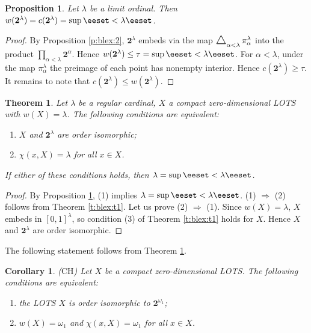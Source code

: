 \documentclass[preprint]{elsarticle}
\def\om{\omega}
\def\al{\alpha}
\def\la{\lambda}
\def\set#1{\bbset#1\eeset}
\def\bbset#1:#2\eeset{\{#1\,:\,#2\}}
\def\diag{\mathop{\bigtriangleup}}
\newtheorem{proposition}{Proposition}[section]
\newtheorem{theorem}{Theorem}[section]
\newtheorem{cor}{Corollary}[section]
\theoremstyle{definition}
\theoremstyle{remark}
\def\rarr{\Rightarrow}
\def\DD{\operatornamewithlimits{%
  \mathchoice{\vcenter{\hbox{\huge \Delta}}}
             {\vcenter{\hbox{\Large \Delta}}}
             {\mathrm{\Delta}}
             {\mathrm{\Delta}}}}
\def\DD{\operatornamewithlimits{\mbox{\hbox{\huge \Delta}}}}
\def\DD{\operatornamewithlimits{\Delta}}
\def\DD{\operatornamewithlimits{%
  \mathchoice{\vcenter{\hbox{\huge $\Delta$}}}
             {\vcenter{\hbox{\Large $\Delta$}}}
             {\mathrm{\Delta}}
             {\mathrm{\Delta}}}}
\def\DD{\operatornamewithlimits{%
  \mathchoice{\vcenter{\hbox{\huge $\bigtriangleup$}}}
             {\vcenter{\hbox{\Large $\bigtriangleup$}}}
             {\mathrm{\bigtriangleup}}
             {\mathrm{\bigtriangleup}}}}
\def\diag{\DD}
\def\lex#1#2{\mathfrak{L}(#2^{#1})}
\def\lex#1#2{#2^{#1}}
\def\B{2}
\def\B{\mathsf{2}}
\def\B{\mathbf{2}}
\def\jumps#1{\mathfrak{J}(#1)}
\def\lexab{\lex\la\B}
\begin{document}
\begin{proposition}\label{p:blex:3}
Let $\la$ be a limit ordinal. Then $w(\lexab)=c(\lexab)=\sup\set{2^\al: \al<\la}$.
\end{proposition}
\begin{proof}
By Proposition \ref{p:blex:2}, $\lexab$ embeds via the map $\diag_{\al<\la} \pi_\al^\la$ into the product $\prod_{\al<\la} \lex\al\B$. Hence $w(\lexab)\leq \tau= \sup\set{2^\al: \al<\la}$.
For $\al<\la$, under the map $\pi^\la_\al$ the preimage of each point has nonempty interior. Hence $c(\lexab)\geq \tau$. It remains to note that $c(\lexab)\leq w(\lexab)$.
\end{proof}

\begin{theorem}\label{t:blex:1}
Let $\la$ be a regular cardinal, $X$ a compact zero-dimensional LOTS with $w(X)=\la$.
The following conditions are equivalent:
\begin{enumerate}
\item
$X$ and $\lexab$ are order isomorphic;
\item
$\chi(x,X)=\la$ for all $x\in X$.
\end{enumerate}
If either of these conditions holds, then $\la=\sup\set{2^\al: \al<\la}$.
\end{theorem}
\begin{proof}
By Proposition \ref{p:blex:3}, (1) implies $\la=\sup\set{2^\al: \al<\la}$.
(1) $\rarr$ (2) follows from Theorem \ref{t:blex:t1}.
Let us prove (2) $\rarr$ (1). Since $w(X)=\la$, $X$ embeds in $[0,1]^\la$, so condition (3) of Theorem \ref{t:blex:t1} holds for $X$. Hence $X$ and $\lexab$ are order isomorphic.
\end{proof}

The following statement follows from Theorem \ref{t:blex:1}.

\begin{cor}\label{c:blex:1}
{\rm ($\mathrm{CH}$)}
Let $X$ be a compact zero-dimensional LOTS.
The following conditions are equivalent:
\begin{enumerate}
\item
the LOTS $X$ is order isomorphic to $\lex {\om_1} \B$;
\item
$w(X)=\om_1$ and $\chi(x,X)=\om_1$ for all $x\in X$.
\end{enumerate}
\end{cor}
\end{document}
